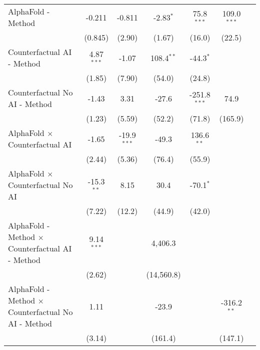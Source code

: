 \begin{tabular}{lcccccc}
   AlphaFold - Method                                         & -0.211       & -0.811        & -2.83$^{*}$  & 75.8$^{***}$   & 109.0$^{***}$  &   \\   
                                                              & (0.845)      & (2.90)        & (1.67)       & (16.0)         & (22.5)         &   \\   
   Counterfactual AI - Method                                 & 4.87$^{***}$ & -1.07         & 108.4$^{**}$ & -44.3$^{*}$    &                &   \\   
                                                              & (1.85)       & (7.90)        & (54.0)       & (24.8)         &                &   \\   
   Counterfactual No AI - Method                              & -1.43        & 3.31          & -27.6        & -251.8$^{***}$ & 74.9           &   \\   
                                                              & (1.23)       & (5.59)        & (52.2)       & (71.8)         & (165.9)        &   \\   
   AlphaFold $\times$ Counterfactual AI                       & -1.65        & -19.9$^{***}$ & -49.3        & 136.6$^{**}$   &                &   \\   
                                                              & (2.44)       & (5.36)        & (76.4)       & (55.9)         &                &   \\   
   AlphaFold $\times$ Counterfactual No AI                    & -15.3$^{**}$ & 8.15          & 30.4         & -70.1$^{*}$    &                &   \\   
                                                              & (7.22)       & (12.2)        & (44.9)       & (42.0)         &                &   \\   
   AlphaFold - Method $\times$ Counterfactual AI - Method     & 9.14$^{***}$ &               & 4,406.3      &                &                &   \\   
                                                              & (2.62)       &               & (14,560.8)   &                &                &   \\   
   AlphaFold - Method $\times$ Counterfactual No AI - Method  & 1.11         &               & -23.9        &                & -316.2$^{**}$  &   \\   
                                                              & (3.14)       &               & (161.4)      &                & (147.1)        &   \\   

\end{tabular}
